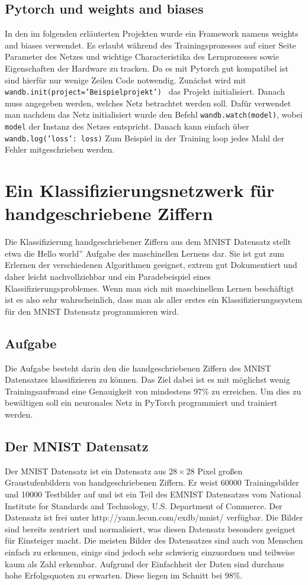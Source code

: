 \documentclass[11pt]{article}
\begin{document}
\subsection{Pytorch und weights and biases}
In den im folgenden erläuterten Projekten wurde ein Framework namens weights and biases verwendet. Es erlaubt während des Trainingsprozesses auf einer Seite Parameter des Netzes und wichtige Characteristika des Lernprozesses sowie Eigenschaften der Hardware zu tracken. Da es mit Pytorch gut kompatibel ist sind hierfür nur wenige Zeilen Code notwendig. Zunächst wird mit\\ \texttt{wandb.init(project='Beispielprojekt')
} das Projekt initialisiert. Danach muss angegeben werden, welches Netz betrachtet werden soll. Dafür verwendet man nachdem das Netz initialisiert wurde den Befehl \texttt{wandb.watch(model)}, wobei \texttt{model} der Instanz des Netzes entspricht. Danach kann einfach über\\ 
\texttt{wandb.log({'loss': loss})} Zum Beispiel in der Training loop jedes Mahl der Fehler mitgeschrieben werden.
\section{Ein Klassifizierungsnetzwerk für handgeschriebene Ziffern}
Die Klassifizierung handgeschriebener Ziffern aus dem MNIST Datensatz stellt etwa die \glqq Hello world'' Aufgabe des maschinellen Lernens dar. Sie ist gut zum Erlernen der verschiedenen Algorithmen geeignet, extrem gut Dokumentiert und daher leicht nachvollziehbar und ein Paradebeispiel eines Klassifizierungsproblemes. Wenn man sich mit maschinellem Lernen beschäftigt ist es also sehr wahrscheinlich, dass man als aller erstes ein Klassifizierungssystem für den MNIST Datensatz programmieren wird.
\subsection{Aufgabe}
Die Aufgabe besteht darin den die handgeschriebenen Ziffern des MNIST Datensatzes klassifizieren zu können. Das Ziel dabei ist es mit möglichst wenig Trainingsaufwand eine Genauigkeit von mindestens 97\% zu erreichen. Um dies zu bewältigen soll ein neuronales Netz in PyTorch programmiert und trainiert werden.
\subsection{Der MNIST Datensatz}
Der MNIST Datensatz ist ein Datensatz aus $28\times28$ Pixel großen Graustufenbildern von handgeschriebenen Ziffern. Er weist 60000 Trainingsbilder und 10000 Testbilder auf und ist ein Teil des EMNIST Datensatzes vom National Institute for Standards and Technology, U.S. Department of Commerce. Der Datensatz ist frei unter http://yann.lecun.com/exdb/mnist/ verfügbar. Die Bilder sind bereits zentriert und normalisiert, was diesen Datensatz besonders geeignet für Einsteiger macht. Die meisten Bilder des Datensatzes sind auch von Menschen einfach zu erkennen, einige sind jedoch sehr schwierig einzuordnen und teilweise kaum als Zahl erkennbar. Aufgrund der Einfachheit der Daten sind durchaus hohe Erfolgsquoten zu erwarten. Diese liegen im Schnitt bei 98\%.
\end{document}
